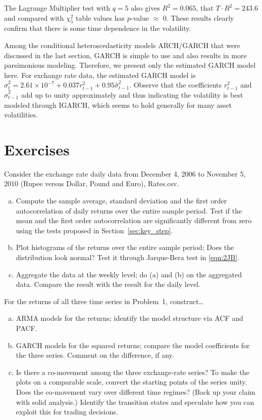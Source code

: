 The Lagrange Multiplier test with $q=5$ also gives $R^2= 0.065$, that $T \cdot R^2 = 243.6$ and compared with $\chi_5^2$ table values has $p$-value $\approx$ 0. These results clearly confirm that there is some time dependence in the volatility.


Among the conditional heteroscedasticity models ARCH/GARCH that were discussed in the last section, GARCH is simple to use and also results in more parsimonious modeling. Therefore, we present only the estimated GARCH model here. For exchange rate data, the estimated GARCH model is $\hat{\sigma}_t^2 = 2.61 \times 10^{-7} + 0.037r_{t-1}^2 + 0.95\hat{\sigma}_{t-1}^2$. Observe that the coefficients $r_{t-1}^2$ and $\hat{\sigma}_{t-1}^2$ add up to unity approximately and thus indicating the volatility is best modeled through IGARCH, which seems to hold generally for many asset volatilities.



\section{Exercises}


\prob Consider the exchange rate daily data from December 4, 2006 to November 5, 2010 (Rupee versus Dollar, Pound and Euro), Rates.csv.

\begin{enumerate}[(a)]
\item Compute the sample average, standard deviation and the first order autocorrelation of daily returns over the entire sample period.  Test if the mean and the first order autocorrelation are significantly different from zero using the tests proposed in Section~\ref{sec:key_step}. 
\item Plot histograms of the returns over the entire sample period; Does the distribution look normal?  Test it through Jarque-Bera test in \eqref{eqn:2JB}.
\item Aggregate the data at the weekly level; do (a) and (b) on the aggregated data. Compare the result with the result for the daily level. \twomedskip
\end{enumerate}


\prob For the returns of all three time series in Problem~1,  construct\dots

\begin{enumerate}[(a)]
\item ARMA models for the returns; identify the model structure via ACF and PACF.
\item  GARCH models for the squared returns; compare the model coefficients for the three series.  Comment on the difference, if any.
\item Is there a co-movement among the three exchange-rate series? To make the plots on a comparable scale, convert the starting points of the series unity. Does the co-movement vary over different time regimes? (Back up your claim with solid analysis.) Identify the transition states and speculate how you can exploit this for trading decisions. \twomedskip
\end{enumerate}


